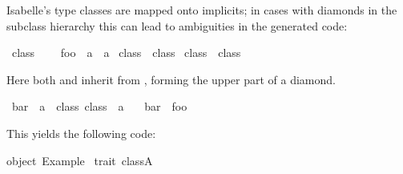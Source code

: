 \begin{isabellebody}
\begin{isamarkuptext}
  Isabelle's type classes are mapped onto  implicits; in
  cases with diamonds in the subclass hierarchy this can lead to
  ambiguities in the generated code:%
\end{isamarkuptext}%
\isamarkuptrue%
%
\isadelimquote
%
\endisadelimquote
%
\isatagquote
{}\isamarkupfalse%
\ class{}\ {}\isanewline
\ \ \ foo\ {}{}\ {}{}a\ {}\ {}a{}\isanewline
\isanewline
{}\isamarkupfalse%
\ class{}\ {}\ class{}\isanewline
\isanewline
{}\isamarkupfalse%
\ class{}\ {}\ class{}%
\endisatagquote
{\isafoldquote}%
%
\isadelimquote
%
\endisadelimquote
%
\begin{isamarkuptext}%
\noindent Here both  and  inherit from ,
  forming the upper part of a diamond.%
\end{isamarkuptext}%
\isamarkuptrue%
%
\isadelimquote
%
\endisadelimquote
%
\isatagquote
{}\isamarkupfalse%
\ bar\ {}{}\ {}{}a\ {}{}\ {}class{}{}\ class{}{}\ {}\ {}a{}\ \isanewline
\ \ {}bar\ {}\ foo{}%
\endisatagquote
{\isafoldquote}%
%
\isadelimquote
%
\endisadelimquote
%
\begin{isamarkuptext}%
\noindent This yields the following code:%
\end{isamarkuptext}%
\isamarkuptrue%
%
\isadelimquotetypewriter
%
\endisadelimquotetypewriter
%
\isatagquotetypewriter
%
\begin{isamarkuptext}%
object\ Example\ {}\isanewline
\isanewline
trait\ class{}{}A{}\ {}\isanewline

\end{isamarkuptext}
\end{isabellebody}
